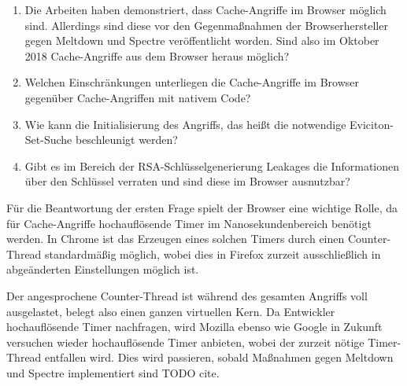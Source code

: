 \begin{enumerate}
\item Die Arbeiten \cite{TheSpyInTheSandbox,DriveByPaper,ASLROnTheLine} haben demonstriert, dass Cache-Angriffe im Browser möglich sind. 
Allerdings sind diese vor den Gegenmaßnahmen der Browserhersteller gegen Meltdown und Spectre veröffentlicht worden.
Sind also im Oktober 2018 Cache-Angriffe aus dem Browser heraus möglich?

\item Welchen Einschränkungen unterliegen die Cache-Angriffe im Browser gegenüber Cache-Angriffen mit nativem Code?

\item Wie kann die Initialisierung des Angriffs, das heißt die notwendige Eviciton-Set-Suche beschleunigt werden?

\item Gibt es im Bereich der RSA-Schlüsselgenerierung Leakages die Informationen über den Schlüssel verraten und sind diese im Browser ausnutzbar?
\end{enumerate}


Für die Beantwortung der ersten Frage spielt der Browser eine wichtige Rolle, da für Cache-Angriffe hochauflösende Timer im Nanosekundenbereich benötigt werden.
In Chrome ist das Erzeugen eines solchen Timers durch einen Counter-Thread standardmäßig möglich, wobei dies in Firefox zurzeit ausschließlich in abgeänderten Einstellungen möglich ist.

Der angesprochene Counter-Thread ist während des gesamten Angriffs voll ausgelastet, belegt also einen ganzen virtuellen Kern.
Da Entwickler hochauflösende Timer nachfragen, wird Mozilla ebenso wie Google in Zukunft versuchen wieder hochauflösende Timer anbieten, wobei der zurzeit nötige Timer-Thread entfallen wird.
Dies wird passieren, sobald Maßnahmen gegen Meltdown und Spectre implementiert sind TODO cite.

\par\medskip 



